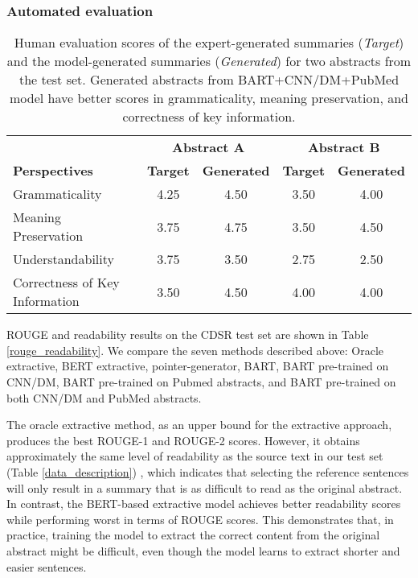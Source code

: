\documentclass[letterpaper, table]{article} %
\begin{document}
\subsubsection{Automated evaluation}



\begin{table*}
\centering
\begin{tabular}{@{} l cc cc @{}}
\toprule
                  & \multicolumn{2}{c}{\textbf{Abstract A}} & \multicolumn{2}{c}{\textbf{Abstract B}} \\
\cmidrule(lr){2-3}
\cmidrule(lr){4-5}
\textbf{Perspectives} & \textbf{Target}  & \textbf{Generated} & \textbf{Target}  & \textbf{Generated} \\
\midrule
Grammaticality            & 4.25    & 4.50        &3.50     & 4.00 \\
Meaning Preservation       & 3.75    & 4.75       & 3.50     & 4.50 \\
Understandability  & 3.75    & 3.50        & 2.75    & 2.50     \\
Correctness of Key Information        & 3.50     & 4.50    & 4.00       & 4.00 \\
\bottomrule
\end{tabular}
\caption{Human evaluation scores of the expert-generated summaries (\textit{Target}) and the model-generated summaries (\textit{Generated}) for two abstracts from the test set. Generated abstracts from BART+CNN/DM+PubMed model have better scores in grammaticality, meaning preservation, and correctness of key information.}
\label{result_human_evaluation}

\end{table*}
ROUGE and readability results on the CDSR test set are shown in Table \ref{rouge_readability}. We compare the seven methods described above: Oracle extractive, BERT extractive, pointer-generator, BART, BART pre-trained on CNN/DM, BART pre-trained on Pubmed abstracts, and BART pre-trained on both CNN/DM and PubMed abstracts.

The oracle extractive method, as an upper bound for the extractive approach, produces the best ROUGE-1 and ROUGE-2 scores. However, it obtains approximately the same level of readability as the source text in our test set (Table \ref{data_description})
, which indicates that selecting the reference sentences will only result in a summary that is as difficult to read as the original abstract.
In contrast, the BERT-based extractive model achieves better readability scores while performing worst in terms of ROUGE scores. This demonstrates that, in practice, training the model to extract the correct content from the original abstract might be difficult, even though the model learns to extract shorter and easier sentences.
\end{document}

